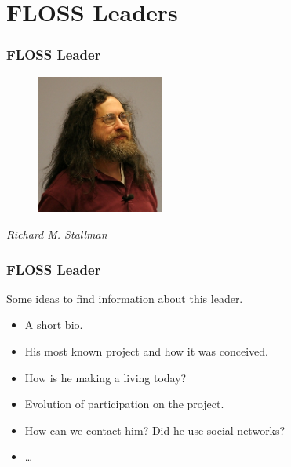 \documentclass{beamer}
\begin{document}
\section{FLOSS Leaders}

\begin{frame}
\frametitle{FLOSS Leader}

\begin{figure}[h]
\begin{center}
  \includegraphics[height=1.80in]{figs/rms.jpg}
\end{center}
\end{figure}

\pause

\begin{center}
{\it Richard M. Stallman}
\end{center}

\end{frame}

\begin{frame}
\frametitle{FLOSS Leader}

Some ideas to find information about this leader.
\pause
\begin{itemize}
\item A short bio.
\item His most known project and how it was conceived.
\item How is he making a living today?
\item Evolution of participation on the project.
\item How can we contact him? Did he use social networks?
\item \ldots
\end{itemize}

\end{frame}
\end{document}
